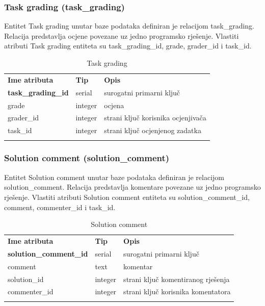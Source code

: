 \documentclass[times, utf8, zavrsni]{fer}
\begin{document}
		\subsubsection{Task grading (task\_grading)}
		Entitet Task grading unutar baze podataka definiran je relacijom task\_grading. Relacija predstavlja ocjene povezane uz jedno programsko rješenje. Vlastiti atributi Task grading entiteta su task\_grading\_id, grade, grader\_id i task\_id. 
		\begin{table}[H]
			\caption{Task grading}
			\label{tbl:taskgrading}
			\centering
			\begin{tabu} to \textwidth {XXX}
				\tabucline[1.75pt]{-}
				\textbf{Ime atributa} & \textbf{Tip} & \textbf{Opis}\\ 				
				\tabucline[1pt]{-}
				\textbf{task\_grading\_id} & serial & surogatni primarni ključ\\ \hline
				grade & integer & ocjena\\ \hline
				grader\_id & integer & strani ključ korisnika ocjenjivača\\ \hline
				task\_id & integer & strani ključ ocjenjenog zadatka\\ \hline
				\tabucline[1.75pt]{-}
			\end{tabu}
		\end{table}
	
		\subsubsection{Solution comment (solution\_comment)}
		Entitet Solution comment unutar baze podataka definiran je relacijom solution\_comment. Relacija predstavlja komentare povezane uz jedno programsko rješenje. Vlastiti atributi Solution comment entiteta su solution\_comment\_id, comment, commenter\_id i task\_id. 
		\begin{table}[H]
			\caption{Solution comment}
			\label{tbl:solutioncomment}
			\centering
			\begin{tabu} to \textwidth {XXX}
				\tabucline[1.75pt]{-}
				\textbf{Ime atributa} & \textbf{Tip} & \textbf{Opis}\\ 				
				\tabucline[1pt]{-}
				\textbf{solution\_comment\_id} & serial & surogatni primarni ključ\\ \hline
				comment & text & komentar\\ \hline
				solution\_id & integer & strani ključ komentiranog rješenja\\ \hline
				commenter\_id & integer & strani ključ korisnika komentatora\\ \hline
				\tabucline[1.75pt]{-}
			\end{tabu}
		\end{table}
	
\end{document}
